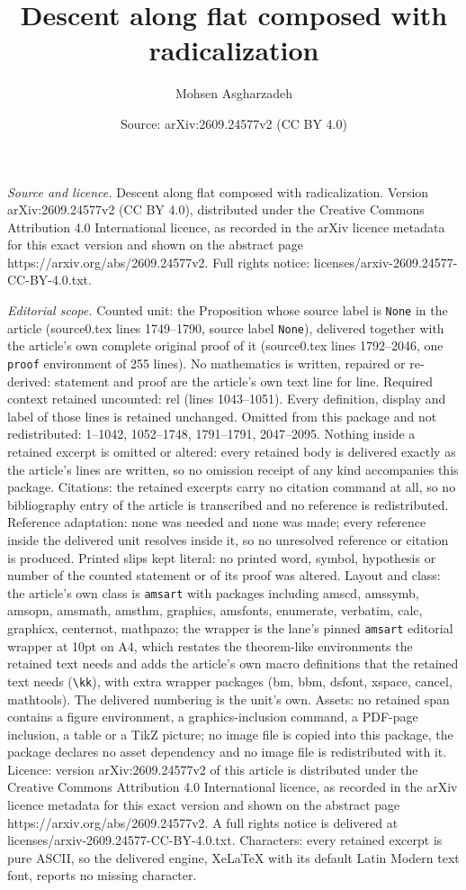 \documentclass[10pt,a4paper]{amsart}
\title[Descent along flat composed with radicalization]{Descent along flat composed with radicalization}
\author{Mohsen Asgharzadeh}
\date{Source: arXiv:2609.24577v2 (CC BY 4.0)}
\begin{document}
\maketitle

\noindent\emph{Source and licence.} Descent along flat composed with radicalization. Version arXiv:2609.24577v2 (CC BY 4.0), distributed under the Creative Commons Attribution 4.0 International licence, as recorded in the arXiv licence metadata for this exact version and shown on the abstract page https://arxiv.org/abs/2609.24577v2. Full rights notice: licenses/arxiv-2609.24577-CC-BY-4.0.txt.\par\smallskip

\noindent\textit{Editorial scope.} Counted unit: the Proposition whose source label is \texttt{None} in the article (source0.tex lines 1749--1790, source label \texttt{None}), delivered together with the article's own complete original proof of it (source0.tex lines 1792--2046, one \texttt{proof} environment of 255 lines). No mathematics is written, repaired or re-derived: statement and proof are the article's own text line for line. Required context retained uncounted: rel (lines 1043--1051). Every definition, display and label of those lines is retained unchanged. Omitted from this package and not redistributed: 1--1042, 1052--1748, 1791--1791, 2047--2095. Nothing inside a retained excerpt is omitted or altered: every retained body is delivered exactly as the article's lines are written, so no omission receipt of any kind accompanies this package. Citations: the retained excerpts carry no citation command at all, so no bibliography entry of the article is transcribed and no reference is redistributed. Reference adaptation: none was needed and none was made; every reference inside the delivered unit resolves inside it, so no unresolved reference or citation is produced. Printed slips kept literal: no printed word, symbol, hypothesis or number of the counted statement or of its proof was altered. Layout and class: the article's own class is \texttt{amsart} with packages including amscd, amssymb, amsopn, amsmath, amsthm, graphics, amsfonts, enumerate, verbatim, calc, graphicx, centernot, mathpazo; the wrapper is the lane's pinned \texttt{amsart} editorial wrapper at 10pt on A4, which restates the theorem-like environments the retained text needs and adds the article's own macro definitions that the retained text needs (\texttt{\textbackslash kk}), with extra wrapper packages (bm, bbm, dsfont, xspace, cancel, mathtools). The delivered numbering is the unit's own. Assets: no retained span contains a figure environment, a graphics-inclusion command, a PDF-page inclusion, a table or a TikZ picture; no image file is copied into this package, the package declares no asset dependency and no image file is redistributed with it. Licence: version arXiv:2609.24577v2 of this article is distributed under the Creative Commons Attribution 4.0 International licence, as recorded in the arXiv licence metadata for this exact version and shown on the abstract page https://arxiv.org/abs/2609.24577v2. A full rights notice is delivered at licenses/arxiv-2609.24577-CC-BY-4.0.txt. Characters: every retained excerpt is pure ASCII, so the delivered engine, XeLaTeX with its default Latin Modern text font, reports no missing character.
\end{document}

